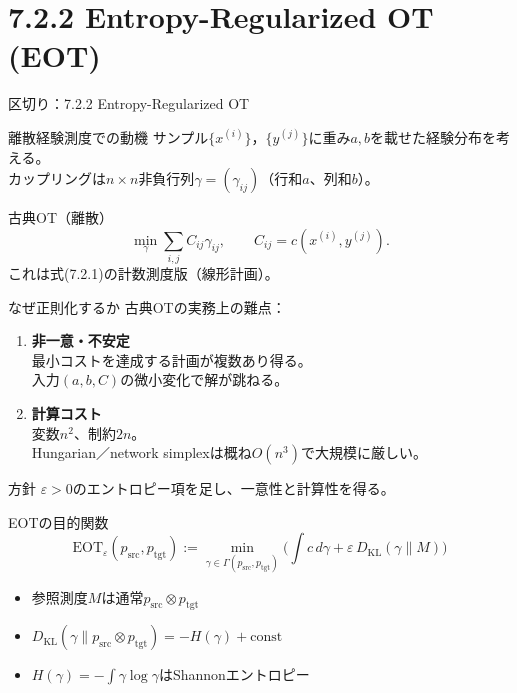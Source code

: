 \section{7.2.2 Entropy-Regularized OT (EOT)}
\asmain
\begin{frame}{区切り：7.2.2 Entropy-Regularized OT}
    \tableofcontents[currentsection]
\end{frame}
\asmain
\begin{frame}{離散経験測度での動機}
    サンプル$\{x^{(i)}\}$，$\{y^{(j)}\}$に重み$a,b$を載せた経験分布を考える。\\
    カップリングは$n\times n$非負行列$\gamma=(\gamma_{ij})$（行和$a$、列和$b$）。
    \begin{block}{古典OT（離散）}
        \[
            \min_{\gamma}
            \sum_{i,j} C_{ij}\gamma_{ij},
            \qquad
            C_{ij}=c(x^{(i)},y^{(j)}).
        \]
        これは式(7.2.1)の計数測度版（線形計画）。
    \end{block}
\end{frame}
\asmain
\begin{frame}{なぜ正則化するか}
    古典OTの実務上の難点：
    \begin{enumerate}
        \item \textbf{非一意・不安定}\\
        最小コストを達成する計画が複数あり得る。\\
        入力$(a,b,C)$の微小変化で解が跳ねる。
        \item \textbf{計算コスト}\\
        変数$n^{2}$、制約$2n$。\\
        Hungarian／network simplexは概ね$O(n^{3})$で大規模に厳しい。
    \end{enumerate}
    \begin{exampleblock}{方針}
        $\varepsilon>0$のエントロピー項を足し、一意性と計算性を得る。
    \end{exampleblock}
\end{frame}
\asmain
\begin{frame}{EOTの目的関数}
    \[
        \mathrm{EOT}_{\varepsilon}(p_{\mathrm{src}},p_{\mathrm{tgt}})
        :=
        \min_{\gamma\in\Gamma(p_{\mathrm{src}},p_{\mathrm{tgt}})}
        \Biggl(
        \int c\,d\gamma
        +
        \varepsilon\,D_{\mathrm{KL}}(\gamma\|M)
        \Biggr)
        \tag{7.2.5}
    \]
    \begin{itemize}
        \item 参照測度$M$は通常$p_{\mathrm{src}}\otimes p_{\mathrm{tgt}}$
        \item $D_{\mathrm{KL}}(\gamma\|p_{\mathrm{src}}\otimes p_{\mathrm{tgt}})=-H(\gamma)+\mathrm{const}$
        \item $H(\gamma)=-\int\gamma\log\gamma$はShannonエントロピー
    \end{itemize}
\end{frame}
